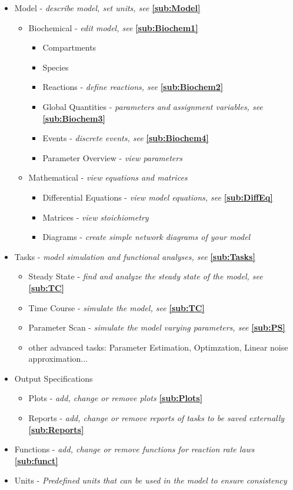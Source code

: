 \documentclass[a4paper,11pt,twoside]{article}
\begin{document}
\begin{itemize}
\item Model  - \textit{describe model,  set units, see }\textbf{\ref{sub:Model}}
 \begin{itemize}
 \item  Biochemical   -  \textit{edit  model,  see } \textbf{\ref{sub:Biochem1}}
  \begin{itemize}
  \item Compartments
  \item Species
  \item  Reactions  - \textit{define  reactions,   see }\textbf{\ref{sub:Biochem2}}
  \item Global Quantities  - \textit{parameters and assignment  variables, see }\textbf{\ref{sub:Biochem3}}
  \item  Events  -  \textit{discrete  events,  see }\textbf{\ref{sub:Biochem4}}
  \item Parameter Overview - \textit{view parameters}
  \end{itemize}
 \item Mathematical - \textit{view equations and matrices}
  \begin{itemize}
  \item Differential Equations - \textit{view model equations,  see }\textbf{\ref{sub:DiffEq}}
  \item Matrices - \textit{view stoichiometry}
 \item Diagrams - \textit{create simple network diagrams of your model}
  \end{itemize}
 \end{itemize}
\item Tasks - \textit{model simulation and functional analyses, see }\textbf{\ref{sub:Tasks}}
 \begin{itemize} 
 \item Steady State -  \textit{find and analyze the steady state of the model, see }\textbf{\ref{sub:TC}}
 \item Time  Course -  \textit{simulate the  model, see }\textbf{\ref{sub:TC}}
 \item  Parameter Scan  - \textit{simulate  the  model varying parameters, see }\textbf{\ref{sub:PS}}
 \item other advanced tasks: Parameter Estimation, Optimzation, Linear noise approximation...
 \end{itemize}
\item Output Specifications
 \begin{itemize}
 \item Plots - \textit{add, change or remove plots} \textbf{\ref{sub:Plots}}
\item Reports - \textit{add, change or remove reports of tasks to be saved externally} \textbf{\ref{sub:Reports}}
 \end{itemize}
\item Functions - \textit{add,  change or remove  functions for reaction rate laws} \textbf{\ref{sub:funct}}
\item Units - \textit{Predefined units that can be used in the model to ensure consistency}

\end{itemize}
\end{document}
